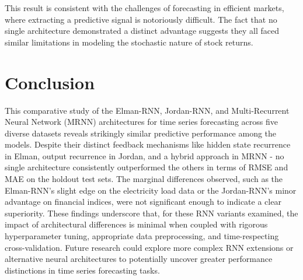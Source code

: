 \documentclass[conference, 10pt]{IEEEtran}
\begin{document}
This result is consistent with the challenges of forecasting in efficient markets, where extracting a predictive signal
is notoriously difficult. The fact that no single architecture demonstrated a distinct advantage suggests they all faced
similar limitations in modeling the stochastic nature of stock returns.


\section{Conclusion}

This comparative study of the Elman-RNN, Jordan-RNN, and Multi-Recurrent Neural Network (MRNN) architectures for time
series forecasting across five diverse datasets reveals strikingly similar predictive performance among the models.
Despite their distinct feedback mechanisms like hidden state recurrence in Elman, output recurrence in Jordan, and a hybrid
approach in MRNN - no single architecture consistently outperformed the others in terms of RMSE and MAE on the holdout
test sets. The marginal differences observed, such as the Elman-RNN's slight edge on the electricity load data or the
Jordan-RNN's minor advantage on financial indices, were not significant enough to indicate a clear superiority. These
findings underscore that, for these RNN variants examined, the impact of architectural differences is minimal
when coupled with rigorous hyperparameter tuning, appropriate data preprocessing, and time-respecting cross-validation.
Future research could explore more complex RNN extensions or alternative neural architectures to potentially uncover
greater performance distinctions in time series forecasting tasks.


\nocite{myrepo}


\appendix

\end{document}
